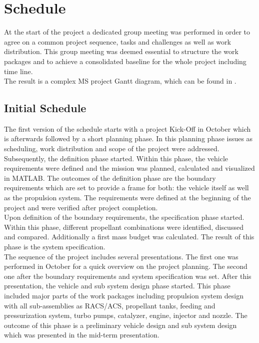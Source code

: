 \chapter{Schedule}

\qquad At the start of the project a dedicated group meeting was performed in order to agree on a common project sequence, tasks and challenges as well as work distribution. This group meeting was deemed essential to structure the work packages and to achieve a consolidated baseline for the whole project including time line.\\

The result is a complex MS project Gantt diagram, which can be found in .\\
\section{Initial Schedule}
\qquad The first version of the schedule starts with a project Kick-Off in October which is afterwards followed by a short planning phase. In this planning phase issues as scheduling, work distribution and scope of the project were addressed.\\

Subsequently, the definition phase started. Within this phase, the vehicle requirements were defined and the mission was planned, calculated and visualized in MATLAB. The outcomes of the definition phase are the boundary requirements which are set to provide a frame for both: the vehicle itself as well as the propulsion system. The requirements were defined at the beginning of the project and were verified after project completion.\\

Upon definition of the boundary requirements, the specification phase started. Within this phase, different propellant combinations were identified, discussed and compared. Additionally a first mass budget was calculated. The result of this phase is the system specification.\\

The sequence of the project includes several presentations. The first one was performed in October for a quick overview on the project planning. The second one after the boundary requirements and system specification was set. 
After this presentation, the vehicle and sub system design phase started. This phase included major parts of the work packages including propulsion system design with all sub-assemblies as RACS/ACS, propellant tanks, feeding and pressurization system, turbo pumps, catalyzer, engine, injector and nozzle. The outcome of this phase is a preliminary vehicle design and sub system design which was presented in the mid-term presentation.\\

